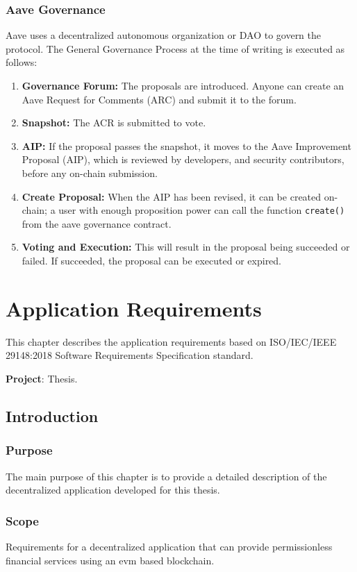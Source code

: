 \documentclass[11pt,a4paper]{report}
\begin{document}
\subsection{Aave Governance}\label{governance}
Aave\cite{aaveV1GOV} uses a decentralized autonomous organization or DAO\cite{wiki:Dao} to govern the protocol. The General Governance Process\cite{gov} at the time of writing is executed as follows:
\begin{enumerate}
	\item \textbf{Governance Forum\cite{govForum}:} The proposals are introduced. Anyone can create an Aave Request for Comments (ARC)\cite{arc} and submit it to the forum.
	\item \textbf{Snapshot\cite{snapshot}:} The ACR is submitted to vote.
	\item \textbf{AIP:} If the proposal passes the snapshot, it moves to the Aave Improvement Proposal (AIP), which is reviewed by developers, and security contributors, before any on-chain submission.
	\item \textbf{Create Proposal:} When the AIP has been revised, it can be created on-chain; a user with enough proposition power can call the function \verb|create()|\cite{create} from the aave governance contract.
	\item \textbf{Voting and Execution:} This will result in the proposal being succeeded or failed. If succeeded, the proposal can be executed or expired.
\end{enumerate}

\chapter{Application Requirements} \label{ch:appreq}
This chapter describes the application requirements based on ISO/IEC/IEEE 29148:2018\cite{iso} Software Requirements Specification standard.

\textbf{Project}: Thesis.
\section{Introduction}
\subsection{Purpose}
The main purpose of this chapter is to provide a detailed description of the decentralized application developed for this thesis. 
\subsection{Scope}
Requirements for a decentralized application that can provide
permissionless financial services using an evm based blockchain.
\end{document}
